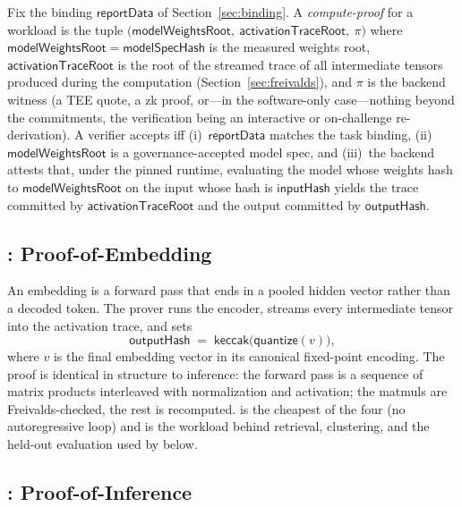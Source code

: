 \begin{definition}
\label{def:primitive}
Fix the binding $\mathsf{reportData}$ of Section~\ref{sec:binding}. A
\emph{compute-proof} for a workload is the tuple
$\bigl(\mathsf{modelWeightsRoot},\ \mathsf{activationTraceRoot},\ \pi\bigr)$ where
$\mathsf{modelWeightsRoot} = \mathsf{modelSpecHash}$ is the measured weights root,
$\mathsf{activationTraceRoot}$ is the root of the streamed trace of all intermediate
tensors produced during the computation (Section~\ref{sec:freivalds}), and $\pi$ is
the backend witness (a TEE quote, a zk proof, or---in the software-only
case---nothing beyond the commitments, the verification being an interactive or
on-challenge re-derivation). A verifier accepts iff
(i)~$\mathsf{reportData}$ matches the task binding,
(ii)~$\mathsf{modelWeightsRoot}$ is a governance-accepted model spec, and
(iii)~the backend attests that, under the pinned runtime, evaluating the model whose
weights hash to $\mathsf{modelWeightsRoot}$ on the input whose hash is
$\mathsf{inputHash}$ yields the trace committed by $\mathsf{activationTraceRoot}$ and
the output committed by $\mathsf{outputHash}$.
\end{definition}

\subsection{\PoE{}: Proof-of-Embedding}

An embedding is a forward pass that ends in a pooled hidden vector rather than a
decoded token. The prover runs the encoder, streams every intermediate tensor into
the activation trace, and sets
\begin{equation}
\mathsf{outputHash} \;=\; \mathsf{keccak}\bigl(\mathsf{quantize}(v)\bigr),
\end{equation}
where $v$ is the final embedding vector in its canonical fixed-point encoding. The
proof is identical in structure to inference: the forward pass is a sequence of
matrix products interleaved with normalization and activation; the matmuls are
Freivalds-checked, the rest is recomputed. \PoE{} is the cheapest of the four (no
autoregressive loop) and is the workload behind retrieval, clustering, and the
held-out evaluation used by \PoC{} below.

\subsection{\PoI{}: Proof-of-Inference}

